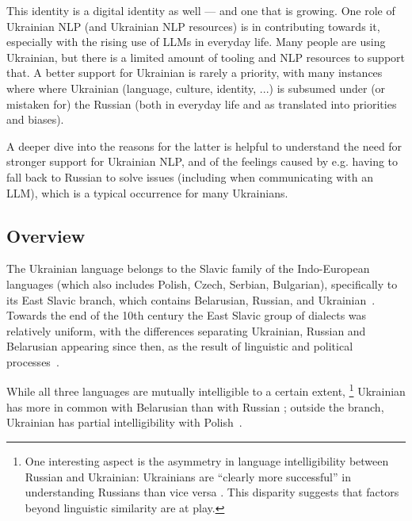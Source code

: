 This identity is a digital identity as well — and one that is growing.
One role of Ukrainian NLP (and Ukrainian NLP resources) is in contributing
towards it, especially with the rising use of LLMs in everyday life.
Many people are using Ukrainian, but there is a limited amount of 
tooling and NLP resources to support that. 
A better support for Ukrainian is rarely a priority, 
with many instances where where Ukrainian (language, culture, identity, ...) 
is subsumed under (or mistaken for) the Russian (both in everyday life and 
as translated into priorities and biases). 

A deeper dive into the reasons for the latter is helpful to understand
the need for stronger support for Ukrainian NLP, and of the feelings
caused by e.g. having to fall back 
to Russian to solve issues (including when communicating with an LLM), which is a typical 
occurrence for many Ukrainians.%




\subsection{Overview}\label{intro-todo-better-title}

The Ukrainian language belongs to the Slavic family of the Indo-European
languages (which also includes Polish, Czech, Serbian,
Bulgarian), specifically to its East Slavic branch, which contains
Belarusian, Russian, and Ukrainian~\cite{grenoble2010contact}. Towards
the end of the 10th century the East 
Slavic
group of dialects was
relatively uniform, with the differences separating Ukrainian, Russian
and Belarusian appearing since then, as the result of linguistic and
political processes~\cite{press2015ukrainian}.

While all three languages are mutually intelligible to a certain extent,%
\footnote{
One interesting aspect is the asymmetry in language intelligibility between
Russian and Ukrainian:
Ukrainians are ``clearly more successful'' in understanding Russians
than vice versa \cite{rehbein2014check}. This disparity suggests that factors beyond linguistic similarity are at play.
} 
Ukrainian
has more in common with Belarusian than with Russian
\cite{press2015ukrainian}; outside the branch, Ukrainian has partial
intelligibility with Polish~\cite{rehbein2014check}. 


